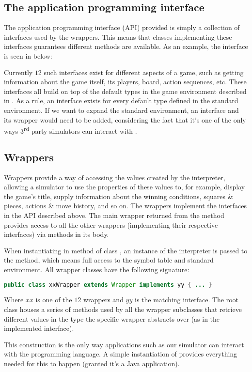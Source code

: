 \subsection{The application programming interface}
The application programming interface (API) provided is simply a collection of interfaces used by the wrappers. This means that classes implementing these interfaces guarantees different methods are available. As an example, the  interface is seen in  below:



Currently $12$ such interfaces exist for different aspects of a game,
such as getting information about the game itself, its players, board,
action sequences, etc. These interfaces all build on top of the default
types in the game environment described in . As a
rule, an interface exists for every default type defined in the standard
environment. If we want to expand the standard environment, an interface
and its wrapper would need to be added, considering the fact that it's
one of the only ways 3\textsuperscript{rd} party simulators can interact
with \productname{}.

\subsection{Wrappers}
Wrappers provide a way of accessing the values created by the
interpreter, allowing a simulator to use the properties of these
values to, for example, display the game's title, supply information
about the winning conditions, squares \& pieces, actions \& move
history, and so on. The wrappers implement the interfaces in the
API described above. The main wrapper returned from the method
 provides access to all the other wrappers
(implementing their respective interfaces) via methods in its body.

When instantiating  in method 
of class , an instance of the interpreter
is passed to the method, which means full access to the symbol table and
standard environment. All wrapper classes have the following signature:

\begin{lstlisting}[language=Java,caption={The signaure of all API wrapper classes.}]
  public class xxWrapper extends Wrapper implements yy { ... }
\end{lstlisting}

Where $xx$ is one of the $12$ wrappers and $yy$ is the matching
interface. The root class  houses a series of methods
used by all the wrapper subclasses that retrieve different values in
the type the specific wrapper abstracts over (as in the implemented
interface).

This construction is the only way applications such as our simulator
can interact with the programming language. A simple instantiation of
 provides everything needed for this to
happen (granted it's a Java application).
